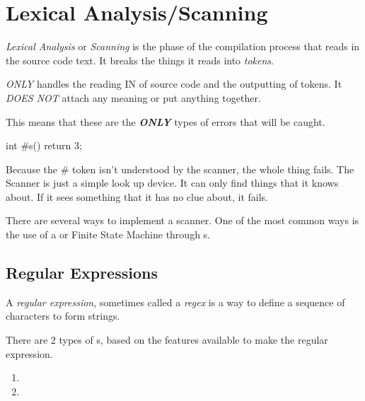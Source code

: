 \section{Lexical Analysis/Scanning}\label{sec:Lexical Analysis}
\begin{definition}\label{def:Lexical Analysis}
  \emph{Lexical Analysis} or \emph{Scanning} is the phase of the compilation process that reads in the source code text.
  It breaks the things it reads into \emph{tokens}.
  \begin{remark}
     \emph{ONLY} handles the reading IN of source code and the outputting of tokens.
    It \emph{DOES NOT} attach any meaning or put anything together.
  \end{remark}

  This means that these are the \textbf{\emph{ONLY}} types of errors that will be caught.
  \begin{javasource}
    int #s() {
      return 3;
    }
  \end{javasource}

  Because the \# token isn't understood by the scanner, the whole thing fails.
  The Scanner is just a simple look up device. It can only find things that it knows about.
  If it sees something that it has no clue about, it fails.
\end{definition}

There are several ways to implement a scanner.
One of the most common ways is the use of a  or Finite State Machine through s.

\subsection{Regular Expressions}\label{subsec:Regular_Expressions}
\begin{definition}\label{def:Regular_Expression}
  A \emph{regular expression}, sometimes called a \emph{regex} is a way to define a sequence of characters to form strings.
\end{definition}

There are 2 types of s, based on the features available to make the regular expression.
\begin{enumerate}[noitemsep]
\item {}
\item {}
\end{enumerate}

